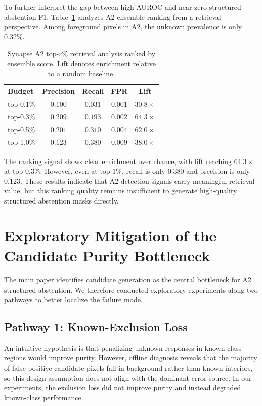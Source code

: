 \documentclass[11pt]{article}
\begin{document}
To further interpret the gap between high AUROC and near-zero structured-abstention F1,
Table~\ref{tab:supp_retrieval} analyzes A2 ensemble ranking from a retrieval
perspective. Among foreground pixels in A2, the unknown prevalence is only 0.32\%.

\begin{table}[h]
\centering
\caption{Synapse A2 top-$r$\% retrieval analysis ranked by ensemble score. Lift denotes enrichment relative to a random baseline.}
\label{tab:supp_retrieval}
\begin{tabular}{lcccc}
\toprule
Budget & Precision & Recall & FPR & Lift \\
\midrule
top-0.1\% & $0.100$ & $0.031$ & $0.001$ & $30.8\times$ \\
top-0.3\% & $0.209$ & $0.193$ & $0.002$ & $64.3\times$ \\
top-0.5\% & $0.201$ & $0.310$ & $0.004$ & $62.0\times$ \\
top-1.0\% & $0.123$ & $0.380$ & $0.009$ & $38.0\times$ \\
\bottomrule
\end{tabular}
\end{table}

The ranking signal shows clear enrichment over chance, with lift reaching
$64.3\times$ at top-0.3\%. However, even at top-1\%, recall is only 0.380 and
precision is only 0.123. These results indicate that A2 detection signals carry
meaningful retrieval value, but this ranking quality remains insufficient to generate
high-quality structured abstention masks directly.

\section{Exploratory Mitigation of the Candidate Purity Bottleneck}

The main paper identifies candidate generation as the central bottleneck for A2
structured abstention. We therefore conducted exploratory experiments along two
pathways to better localize the failure mode.

\subsection{Pathway 1: Known-Exclusion Loss}

An intuitive hypothesis is that penalizing unknown responses in known-class regions
would improve purity. However, offline diagnosis reveals that the majority of
false-positive candidate pixels fall in background rather than known interiors, so this
design assumption does not align with the dominant error source. In our experiments,
the exclusion loss did not improve purity and instead degraded known-class performance.
\end{document}
